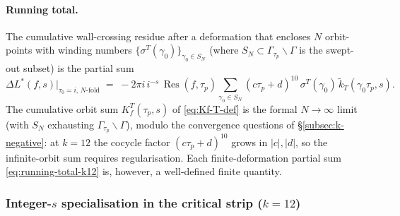 \documentclass[11pt]{article}
\DeclareMathOperator{\Res}{Res}
\begin{document}
\paragraph{Running total.}
The cumulative wall-crossing residue after a deformation that encloses
$N$ orbit-points with winding numbers $\{\sigma^T(\gamma_0)\}_{\gamma_0
\in S_N}$ (where $S_N \subset \Gamma_{\tau_p}\backslash\Gamma$ is the
swept-out subset) is the partial sum
\begin{equation}\label{eq:running-total-k12}
  \Delta L^*(f, s)\bigl|_{\tau_0=i,\,N\text{-fold}}
  \;=\; -2\pi i\,i^{-s}\,\Res(f, \tau_p)\!
  \sum_{\gamma_0 \in S_N}\!
  (c\tau_p + d)^{10}\,\sigma^T(\gamma_0)\,
  \widetilde{k}_T(\gamma_0\tau_p, s).
\end{equation}
The cumulative orbit sum $K_f^T(\tau_p, s)$ of \eqref{eq:Kf-T-def} is
the formal $N \to \infty$ limit (with $S_N$ exhausting
$\Gamma_{\tau_p}\backslash\Gamma$), modulo the convergence questions
of \S\ref{subsec:k-negative}: at $k = 12$ the cocycle factor
$(c\tau_p + d)^{10}$ grows in $|c|, |d|$, so the infinite-orbit sum
requires regularisation.  Each finite-deformation partial sum
\eqref{eq:running-total-k12} is, however, a well-defined finite
quantity.

\subsubsection*{Integer-$s$ specialisation in the critical strip ($k = 12$)}
\end{document}
